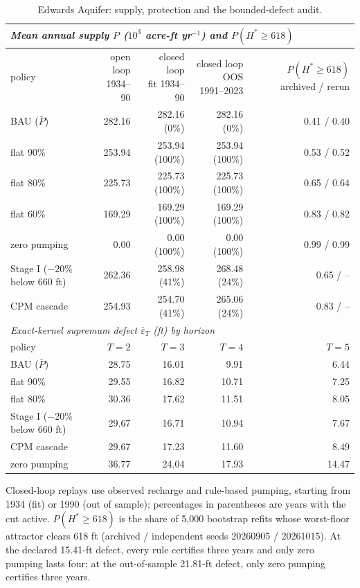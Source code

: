 \begin{table}[t]
\centering
\caption{Edwards Aquifer: supply, protection and the bounded-defect audit.}
\label{tab:edw-unc}
\small
\setlength{\tabcolsep}{4pt}
\begin{tabular}{lrrrr}
\toprule
\multicolumn{5}{l}{\emph{Mean annual supply $P$ ($10^3$ acre-ft yr$^{-1}$) and $P(H^*\ge618)$}} \\
\midrule
policy & \shortstack{open loop\\1934--90} & \shortstack{closed loop\\fit 1934--90} & \shortstack{closed loop OOS\\1991--2023} & \shortstack{$P(H^*\ge618)$\\archived / rerun} \\
\midrule
BAU ($\bar P$) & 282.16 & 282.16 (0\%) & 282.16 (0\%) & 0.41 / 0.40 \\
flat 90\% & 253.94 & 253.94 (100\%) & 253.94 (100\%) & 0.53 / 0.52 \\
flat 80\% & 225.73 & 225.73 (100\%) & 225.73 (100\%) & 0.65 / 0.64 \\
flat 60\% & 169.29 & 169.29 (100\%) & 169.29 (100\%) & 0.83 / 0.82 \\
zero pumping & 0.00 & 0.00 (100\%) & 0.00 (100\%) & 0.99 / 0.99 \\
Stage I ($-20\%$ below 660 ft) & 262.36 & 258.98 (41\%) & 268.48 (24\%) & 0.65 / -- \\
CPM cascade & 254.93 & 254.70 (41\%) & 265.06 (24\%) & 0.83 / -- \\
\midrule
\multicolumn{5}{l}{\emph{Exact-kernel supremum defect $\bar\varepsilon_T$ (ft) by horizon}} \\
\midrule
policy & $T=2$ & $T=3$ & $T=4$ & $T=5$ \\
\midrule
BAU ($\bar P$) & 28.75 & 16.01 & 9.91 & 6.44 \\
flat 90\% & 29.55 & 16.82 & 10.71 & 7.25 \\
flat 80\% & 30.36 & 17.62 & 11.51 & 8.05 \\
Stage I ($-20\%$ below 660 ft) & 29.67 & 16.71 & 10.94 & 7.67 \\
CPM cascade & 29.67 & 17.23 & 11.60 & 8.49 \\
zero pumping & 36.77 & 24.04 & 17.93 & 14.47 \\
\bottomrule
\end{tabular}
\par\smallskip\begin{minipage}{0.97\linewidth}\footnotesize Closed-loop replays use observed recharge and rule-based pumping, starting from 1934 (fit) or 1990 (out of sample); percentages in parentheses are years with the cut active. $P(H^*\ge618)$ is the share of 5,000 bootstrap refits whose worst-floor attractor clears 618 ft (archived / independent seeds 20260905 / 20261015). At the declared 15.41-ft defect, every rule certifies three years and only zero pumping lasts four; at the out-of-sample 21.81-ft defect, only zero pumping certifies three years.\end{minipage}
\end{table}
